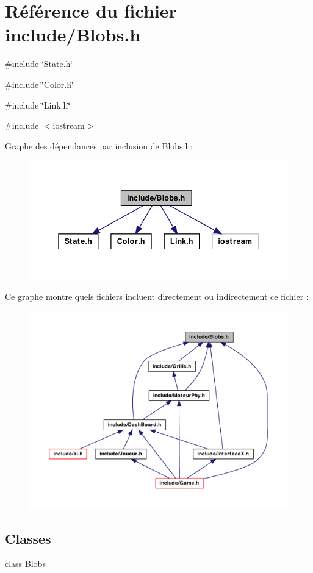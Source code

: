 \hypertarget{a00017}{
\section{Référence du fichier include/Blobs.h}
\label{a00017}
}
{\ttfamily \#include \char`\"{}State.h\char`\"{}}\par
{\ttfamily \#include \char`\"{}Color.h\char`\"{}}\par
{\ttfamily \#include \char`\"{}Link.h\char`\"{}}\par
{\ttfamily \#include $<$iostream$>$}\par
Graphe des dépendances par inclusion de Blobs.h:
\nopagebreak
\begin{figure}[H]
\begin{center}
\leavevmode
\includegraphics[width=348pt]{a00040}
\end{center}
\end{figure}
Ce graphe montre quels fichiers incluent directement ou indirectement ce fichier :
\nopagebreak
\begin{figure}[H]
\begin{center}
\leavevmode
\includegraphics[width=400pt]{a00041}
\end{center}
\end{figure}
\subsection*{Classes}
\begin{DoxyCompactItemize}
\item 
class \hyperlink{a00002}{Blobs}
\end{DoxyCompactItemize}
